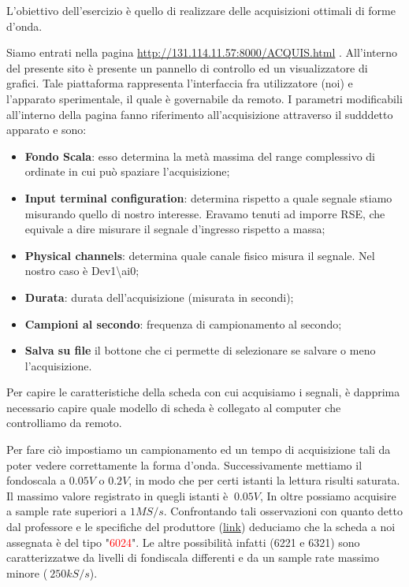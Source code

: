 L'obiettivo dell'esercizio è quello di realizzare delle acquisizioni ottimali di forme d'onda.

Siamo entrati nella pagina \textcolor{airforceblue}{\url{http://131.114.11.57:8000/ACQUIS.html}} . All'interno del presente sito è presente un pannello di controllo ed un visualizzatore di grafici. Tale piattaforma rappresenta l'interfaccia fra utilizzatore (noi) e l'apparato sperimentale, il quale è governabile da remoto. I parametri modificabili all'interno della pagina fanno riferimento all'acquisizione attraverso il sudddetto apparato e sono:
\begin{itemize}
    \item \textbf{Fondo Scala}: esso determina la metà massima del range complessivo di ordinate in cui può spaziare l'acquisizione;
    \item \textbf{Input terminal configuration}: determina rispetto a quale segnale stiamo misurando quello di nostro interesse. Eravamo tenuti ad imporre RSE, che equivale a dire misurare il segnale d'ingresso rispetto a massa;
    \item \textbf{Physical channels}: determina quale canale fisico misura il segnale. Nel nostro caso è Dev1\textbackslash{ai0};
    \item \textbf{Durata}: durata dell'acquisizione (misurata in secondi);
    \item \textbf{Campioni al secondo}: frequenza di campionamento al secondo;
    \item \textbf{Salva su file} il bottone che ci permette di selezionare se salvare o meno l'acquisizione.
\end{itemize}


Per capire le caratteristiche della scheda con cui acquisiamo i segnali, è dapprima necessario capire quale modello di scheda è collegato al computer che controlliamo da remoto.

Per fare ciò impostiamo un campionamento ed un tempo di acquisizione tali da poter vedere correttamente la forma d'onda. Successivamente mettiamo il fondoscala a $0.05V$ o $0.2V$, in modo che per certi istanti la lettura risulti saturata. Il massimo valore registrato in quegli istanti è $~0.05V$, In oltre possiamo acquisire a sample rate superiori a $1MS/s$. Confrontando tali osservazioni con quanto detto dal professore e le specifiche del produttore (\href{https://www.ni.com/pdf/manuals/370719c.pdf}{link}) deduciamo che la scheda a noi assegnata è del tipo "\textcolor{red}{6024}". Le altre possibilità infatti (6221 e 6321) sono caratterizzatwe da livelli di fondiscala differenti e da un sample rate massimo minore ($~250 kS/s$).

